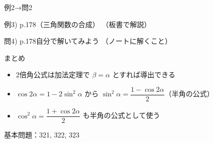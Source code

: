 \documentclass[aspectratio=43,professionalfonts,handout]{beamer}
\begin{document}
\begin{frame}{例2→問2}
  \begin{exampleblock}{例3) p.178（三角関数の合成）}
    （板書で解説）
  \end{exampleblock}

  \vfill

  \begin{block}{問4) p.178\quad 自分で解いてみよう}
    （ノートに解くこと）
  \end{block}
\end{frame}

\begin{frame}{まとめ}
  \begin{itemize}
    \item 2倍角公式は加法定理で $\beta = \alpha$ とすれば導出できる
    \item $\cos 2\alpha = 1 - 2\sin^2\alpha$ から $\sin^2\alpha = \dfrac{1-\cos 2\alpha}{2}$（半角の公式）
    \item $\cos^2\alpha = \dfrac{1+\cos 2\alpha}{2}$ も半角の公式として使う
  \end{itemize}

  \vfill
  {\small 基本問題：321, 322, 323}
\end{frame}
\end{document}
